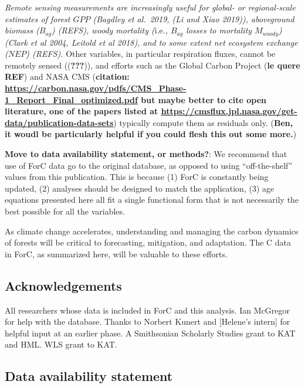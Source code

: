 \documentclass[
]{article}
\begin{document}
\emph{Remote sensing measurements are increasingly useful for global- or
regional-scale estimates of forest \(GPP\) (Bagdley et al.~2019, (Li and
Xiao 2019)), aboveground biomass (\(B_{ag}\)) (REFS), woody mortality
(}i.e.\emph{, \(B_{ag}\) losses to mortality \(M_{woody}\)) (Clark
\emph{et al} 2004, Leitold \emph{et al} 2018), and to some extent net
ecosystem exchange (\(NEP\)) (REFS).} Other variables, in particular
respiration fluxes, cannot be remotely sensed (({\textbf{???}})), and
efforts such as the Global Carbon Project (\textbf{le quere REF}) and
NASA CMS (\textbf{citation:
\url{https://carbon.nasa.gov/pdfs/CMS_Phase-1_Report_Final_optimized.pdf}
but maybe better to cite open literature, one of the papers listed at
\url{https://cmsflux.jpl.nasa.gov/get-data/publication-data-sets}})
typically compute them as residuals only. (\textbf{Ben, it woudl be
particularly helpful if you could flesh this out some more.})

\textbf{Move to data availability statement, or methods?}: We recommend
that use of ForC data go to the original database, as opposed to using
``off-the-shelf'' values from this publication. This is because (1) ForC
is constantly being updated, (2) analyses should be designed to match
the application, (3) age equations presented here all fit a single
functional form that is not necessarily the best possible for all the
variables.

As climate change accelerates, understanding and managing the carbon
dynamics of forests will be critical to forecasting, mitigation, and
adaptation. The C data in ForC, as summarized here, will be valuable to
these efforts.

\hypertarget{acknowledgements}{%
\subsection{Acknowledgements}\label{acknowledgements}}

All researchers whose data is included in ForC and this analysis. Ian
McGregor for help with the database. Thanks to Norbert Kunert and
{[}Helene's intern{]} for helpful input at an earlier phase. A
Smithsonian Scholarly Studies grant to KAT and HML. WLS grant to KAT.

\hypertarget{data-availability-statement}{%
\subsection{Data availability
statement}\label{data-availability-statement}}
\end{document}

